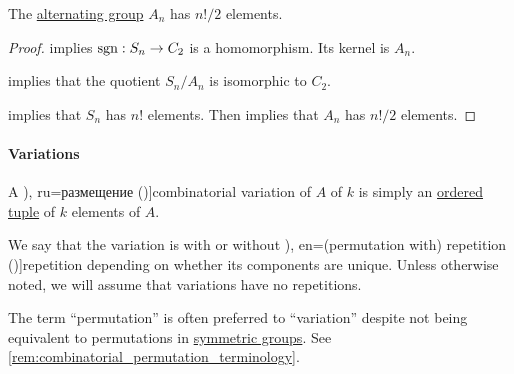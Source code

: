\begin{proposition}\label{thm:alternating_group_cardinality}
  The \hyperref[def:alternating_group]{alternating group} \( A_n \) has \( n! / 2 \) elements.
\end{proposition}
\begin{proof}
   implies \( \operatorname{sgn}: S_n \to C_2 \) is a homomorphism. Its kernel is \( A_n \).

   implies that the quotient \( S_n / A_n \) is isomorphic to \( C_2 \).

   implies that \( S_n \) has \( n! \) elements. Then  implies that \( A_n \) has \( n! / 2 \) elements.
\end{proof}

\paragraph{Variations}

\begin{definition}\label{def:combinatorial_variation}\mimprovised
  A \term[bg=вариация (\cite[27]{ДимитровЯнев2007ВероятностиИСтатистика}), ru=размещение (\cite[171]{Яблонский2003ДискретнаяМатематика})]{combinatorial variation} of \( A \) of  \( k \) is simply an \hyperref[def:ordered_tuple]{ordered tuple} of \( k \) elements of \( A \).

  We say that the variation is with or without \term[bg=(вариация с) повторение (\cite[27]{ДимитровЯнев2007ВероятностиИСтатистика}), en=(permutation with) repetition (\cite[446]{Rosen2019DiscreteMathematics})]{repetition} depending on whether its components are unique. Unless otherwise noted, we will assume that variations have no repetitions.
\end{definition}
\begin{comments}
  \item The term \enquote{permutation} is often preferred to \enquote{variation} despite not being equivalent to permutations in \hyperref[def:symmetric_group]{symmetric groups}. See \cref{rem:combinatorial_permutation_terminology}.
\end{comments}

